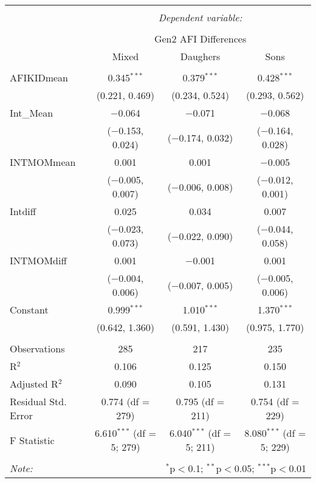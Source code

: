
\begingroup 
\small 
\begin{tabular}{@{\extracolsep{1pt}}lccc} 
\\[-1.8ex]\hline 
\hline \\[-1.8ex] 
 & \multicolumn{3}{c}{\textit{Dependent variable:}} \\ 
\cline{2-4} 
\\[-1.8ex] & \multicolumn{3}{c}{Gen2 AFI Differences} \\ 
 & Mixed & Daughers & Sons \\ 
\hline \\[-1.8ex] 
 AFIKIDmean & 0.345$^{***}$ & 0.379$^{***}$ & 0.428$^{***}$ \\ 
  & (0.221, 0.469) & (0.234, 0.524) & (0.293, 0.562) \\ 
  Int\_Mean & $-$0.064 & $-$0.071 & $-$0.068 \\ 
  & ($-$0.153, 0.024) & ($-$0.174, 0.032) & ($-$0.164, 0.028) \\ 
  INTMOMmean & 0.001 & 0.001 & $-$0.005 \\ 
  & ($-$0.005, 0.007) & ($-$0.006, 0.008) & ($-$0.012, 0.001) \\ 
  Intdiff & 0.025 & 0.034 & 0.007 \\ 
  & ($-$0.023, 0.073) & ($-$0.022, 0.090) & ($-$0.044, 0.058) \\ 
  INTMOMdiff & 0.001 & $-$0.001 & 0.001 \\ 
  & ($-$0.004, 0.006) & ($-$0.007, 0.005) & ($-$0.005, 0.006) \\ 
  Constant & 0.999$^{***}$ & 1.010$^{***}$ & 1.370$^{***}$ \\ 
  & (0.642, 1.360) & (0.591, 1.430) & (0.975, 1.770) \\ 
 \hline \\[-1.8ex] 
Observations & 285 & 217 & 235 \\ 
R$^{2}$ & 0.106 & 0.125 & 0.150 \\ 
Adjusted R$^{2}$ & 0.090 & 0.105 & 0.131 \\ 
Residual Std. Error & 0.774 (df = 279) & 0.795 (df = 211) & 0.754 (df = 229) \\ 
F Statistic & 6.610$^{***}$ (df = 5; 279) & 6.040$^{***}$ (df = 5; 211) & 8.080$^{***}$ (df = 5; 229) \\ 
\hline 
\hline \\[-1.8ex] 
\textit{Note:}  & \multicolumn{3}{r}{$^{*}$p$<$0.1; $^{**}$p$<$0.05; $^{***}$p$<$0.01} \\ 
\end{tabular} 
\endgroup 
